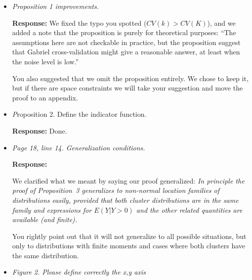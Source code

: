 \documentclass[11pt]{article}
\begin{document}
\begin{itemize}


\item \textit{Proposition 1 improvements.}

\textbf{Response:} We fixed the typo you spotted ($CV(k) > CV(K)$), and we
added a note that the proposition is purely for theoretical purposes:
``The assumptions here are not checkable in practice, but the proposition
suggest that Gabriel cross-validation might give a reasonable answer, at least
when the noise level is low.''

You also suggested that we omit the proposition entirely. We chose to keep it,
but if there are space constraints we will take your suggestion and move the
proof to an appendix.

% 
% 
% 


\item {\textit Proposition 2. Define the indicator function.}

\textbf{Response:} Done.


\item \textit{Page 18, line 14. Generalization conditions.}

\textbf{Response:} 

We clarified what we meant by saying our proof generalized:
\textit{
In principle the proof of Proposition~3 generalizes to
non-normal location families of distributions easily, provided that
both cluster distributions are in the same family and expressions for
$E(Y | Y > 0)$ and the other related quantities are available (and finite).
}

You rightly point out that it will not generalize to all possible situations,
but only to distributions with finite moments and cases where both clusters
have the same distribution.


\item \textit{Figure 2. Please define correctly the x,y axis}


\end{itemize}
\end{document}
